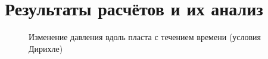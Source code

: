 \documentclass[12pt, a4paper]{article}
\begin{document}





\newpage
\section{Результаты расчётов и их анализ}

\begin{figure}[H]
    \centering
    
    \caption{Изменение давления вдоль пласта с течением времени (условия Дирихле)}
    \label{fig:pressure_evolution2}
\end{figure}
\end{document}
